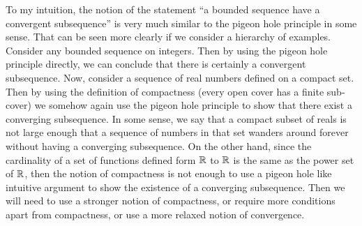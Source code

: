 To my intuition, the notion of the statement ``a bounded sequence have a convergent subsequence'' is very much similar to the pigeon hole principle in some sense. That can be seen more clearly if we consider a hierarchy of examples. Consider any bounded sequence on integers. Then by using the pigeon hole principle directly, we can conclude that there is certainly a convergent subsequence. Now, consider a sequence of real numbers defined on a compact set. Then by using the definition of compactness (every open cover has a finite sub-cover) we somehow again use the pigeon hole principle to show that there exist a converging subsequence. In some sense, we say that a compact subset of reals is not large enough that a sequence of numbers in that set wanders around forever without having a converging subsequence. On the other hand, since the cardinality of a set of functions defined form $ \mathbb{R} $ to $ \mathbb{R} $ is the same as the power set of $ \mathbb{R} $, then the notion of compactness is not enough to use a pigeon hole like intuitive argument to show the existence of a converging subsequence. Then we will need to use a stronger notion of compactness, or require more conditions apart from compactness, or use a more relaxed notion of convergence.


\newpage
